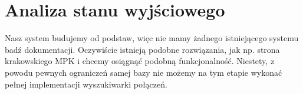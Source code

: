 \section{Analiza stanu wyjściowego}


Nasz system budujemy od podstaw, więc nie mamy żadnego istniejącego systemu badź dokumentacji. Oczywiście istnieją podobne rozwiązania,
jak np. strona krakowskiego MPK i chcemy osiągnąć podobną funkcjonalność. Niestety, z powodu pewnych ograniczeń samej bazy nie możemy na tym etapie wykonać pełnej implementacji wyszukiwarki połączeń.


